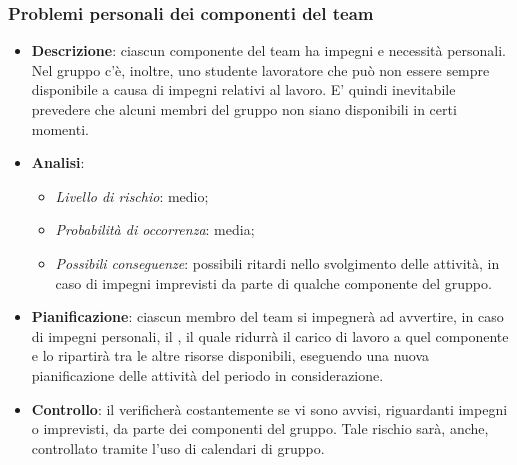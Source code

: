 		\subsubsection{Problemi personali dei componenti del team}
			\begin{itemize}
				\item \textbf{Descrizione}: ciascun componente del team ha impegni e necessità personali. Nel gruppo c'è, inoltre, uno studente lavoratore che può non essere sempre disponibile a causa di impegni relativi al lavoro. E' quindi inevitabile prevedere che alcuni membri del gruppo non siano disponibili in certi momenti.
				\item \textbf{Analisi}:
				\begin{itemize}
					\item \textit{Livello di rischio}: medio;
					\item \textit{Probabilità di occorrenza}: media;
					\item \textit{Possibili conseguenze}: possibili ritardi nello svolgimento delle attività, in caso di impegni imprevisti da parte di qualche componente del gruppo.
				\end{itemize}
				\item \textbf{Pianificazione}: ciascun membro del team si impegnerà ad avvertire, in caso di impegni personali, il , il quale ridurrà il carico di lavoro a quel componente e lo ripartirà tra le altre risorse disponibili, eseguendo una nuova pianificazione delle attività del periodo in considerazione.
				\item \textbf{Controllo}: il  verificherà costantemente se vi sono avvisi, riguardanti impegni o imprevisti, da parte dei componenti del gruppo. Tale rischio sarà, anche, controllato tramite l'uso di calendari di gruppo.
			\end{itemize}
